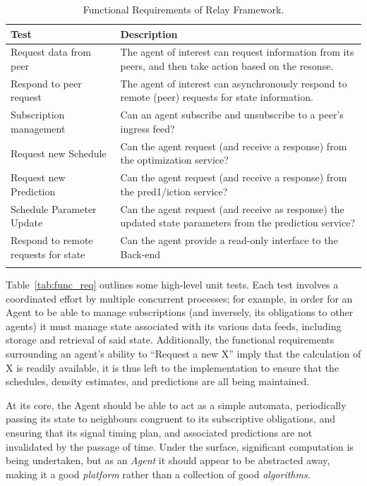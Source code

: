 \documentclass{report}
\begin{document}
\begin{longtable}[H]{| P{4cm} | P{10cm} |} 
\hline
    Test                                & Description                                                                                               \\ \hline
    [network] Request data from peer    & The agent of interest can request information from its peers, and then take action based on the resonse.  \\ \hline
    [network] Respond to peer request   & The agent of interest can asynchronously respond to remote (peer) requests for state information.         \\ \hline
    [network] Subscription management   & Can an agent subscribe and unsubscribe to a peer's ingress feed?                                          \\ \hline
    [opt] Request new Schedule          & Can the agent request (and receive a response)  from the optimization service?                            \\ \hline
    [predict] Request new Prediction    & Can the agent request (and receive a response) from the pred1/iction service?                               \\ \hline
    [predict] Schedule Parameter Update & Can the agent request (and receive as response) the updated state parameters from the prediction service? \\ \hline
    [data] Respond to remote requests for state & Can the agent provide a read-only interface to the Back-end\\ \hline
\caption{Functional Requirements of Relay Framework.}
\end{longtable}\label{tab:func_req}

Table~\ref{tab:func_req} outlines some high-level unit tests.
Each test involves a coordinated effort by multiple concurrent processes; for example, in order for an Agent to be able to manage subscriptions (and inversely, its obligations to other agents) it must manage state associated with its various data feeds, including storage and retrieval of said state.
Additionally, the functional requirements surrounding an agent's ability to ``Request a new X'' imply that the calculation of X is readily available, it is thus left to the implementation to ensure that the schedules, density estimates, and predictions are all being maintained.

At its core, the Agent should be able to act as a simple automata, periodically passing its state to neighbours congruent to its subscriptive obligations, and ensuring that its signal timing plan, and associated predictions are not invalidated by the passage of time.
Under the surface, significant computation is being undertaken, but as an \emph{Agent} it should appear to be abstracted away, making it a good \emph{platform} rather than a collection of good \emph{algorithms}.
\end{document}
